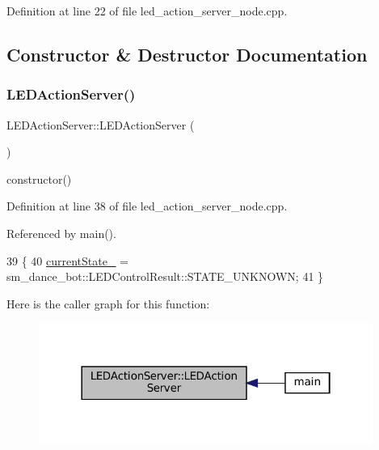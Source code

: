 Definition at line 22 of file led\+\_\+action\+\_\+server\+\_\+node.\+cpp.



\subsection{Constructor \& Destructor Documentation}
\mbox{\label{classLEDActionServer_a6978c43940438b9fd8bfcd6b443092d3}} 
\subsubsection{\texorpdfstring{L\+E\+D\+Action\+Server()}{LEDActionServer()}\hspace{0.1cm}{\footnotesize\ttfamily [1/4]}}
{\footnotesize\ttfamily L\+E\+D\+Action\+Server\+::\+L\+E\+D\+Action\+Server (\begin{DoxyParamCaption}{ }\end{DoxyParamCaption})\hspace{0.3cm}{\ttfamily [inline]}}

constructor() 

Definition at line 38 of file led\+\_\+action\+\_\+server\+\_\+node.\+cpp.



Referenced by main().


\begin{DoxyCode}
39   \{
40     \hyperlink{classLEDActionServer_a1dc456e987dc331501ad6ff2215661ff}{currentState\_} =  sm\_dance\_bot::LEDControlResult::STATE\_UNKNOWN;
41   \}
\end{DoxyCode}
Here is the caller graph for this function\+:
\nopagebreak
\begin{figure}[H]
\begin{center}
\leavevmode
\includegraphics[width=310pt]{classLEDActionServer_a6978c43940438b9fd8bfcd6b443092d3_icgraph}
\end{center}
\end{figure}
\mbox{\label{classLEDActionServer_a6978c43940438b9fd8bfcd6b443092d3}} 
